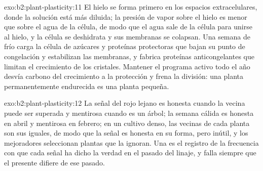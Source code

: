 \begin{solution}{exo:b2:plant-plasticity:11}
El hielo se forma primero en los espacios extracelulares, donde la
solución está más diluida; la presión de vapor sobre el hielo es menor que
sobre el agua de la célula, de modo que el agua sale de la célula para
unirse al hielo, y la célula se deshidrata y sus membranas se colapsan.
Una semana de frío carga la célula de azúcares y proteínas protectoras que
bajan su punto de congelación y estabilizan las membranas, y fabrica
proteínas anticongelantes que limitan el crecimiento de los cristales.
Mantener el programa activo todo el año desvía carbono del crecimiento a
la protección y frena la división: una planta permanentemente endurecida
es una planta pequeña.
\end{solution}

\begin{solution}{exo:b2:plant-plasticity:12}
La señal del rojo lejano es honesta cuando la vecina puede ser superada y
mentirosa cuando es un árbol; la semana cálida es honesta en abril y
mentirosa en febrero; en un cultivo denso, las vecinas de cada planta son
sus iguales, de modo que la señal es honesta en su forma, pero inútil, y
los mejoradores seleccionan plantas que la ignoran. Una 
es el registro de la frecuencia con que cada señal ha dicho la verdad en
el pasado del linaje, y falla siempre que el presente difiere de ese
pasado.
\end{solution}

